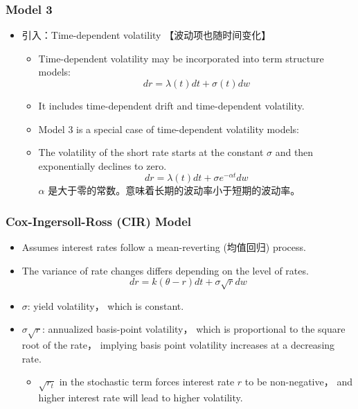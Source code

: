 \subsubsection{Model 3}


\begin{itemize}
    \item 引入：Time-dependent volatility 【波动项也随时间变化】
    \begin{itemize}
        \item Time-dependent volatility may be incorporated into term structure models:
        \[
        dr = \lambda(t)dt + \sigma(t)dw
        \]
        \item It includes time-dependent drift and time-dependent volatility.
        \item Model 3 is a special case of time-dependent volatility models:
        \item The volatility of the short rate starts at the constant \( \sigma \) and then exponentially declines to zero.
        \[
        dr = \lambda(t)dt + \sigma e^{-\alpha t}dw
        \]
        \(\alpha\) 是大于零的常数。意味着长期的波动率小于短期的波动率。
    \end{itemize}
\end{itemize}

\subsubsection{Cox-Ingersoll-Ross (CIR) Model}


\begin{itemize}
    \item Assumes interest rates follow a mean-reverting (均值回归) process.
    \item The variance of rate changes differs depending on the level of rates.
    \[
    dr = k(\theta - r)dt + \sigma \sqrt{r}dw
    \]
    \item \( \sigma \): yield volatility， which is constant.
    \item \( \sigma \sqrt{r} \): annualized basis-point volatility， which is proportional to the square root of the rate， implying basis point volatility increases at a decreasing rate.
    \begin{itemize}
        \item \( \sqrt{r_t} \) in the stochastic term forces interest rate \( r \) to be non-negative， and higher interest rate will lead to higher volatility.
    \end{itemize}
\end{itemize}
